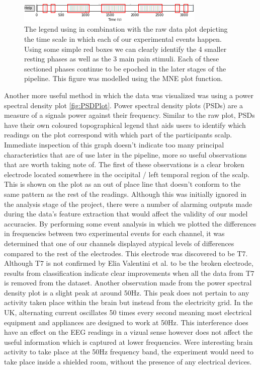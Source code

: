 \documentclass[11pt]{article}
\begin{document}
\begin{figure}[tb]
\centering
\includegraphics[width=0.8\textwidth]{Epoch.png}
\caption{\label{fig:Epoch}The legend using in combination with the raw data plot depicting the time scale in which each of our experimental events happen. Using some simple red boxes we can clearly identify the 4 smaller resting phases as well as the 3 main pain stimuli. Each of these sectioned phases continue to be epoched in the later stages of the pipeline. This figure was modelled using the MNE plot function.}
\end{figure} 

Another more useful method in which the data was visualized was using a power spectral density plot \ref{fig:PSDPlot}. Power spectral density plots (PSDs) are a measure of a signals power against their frequency. Similar to the raw plot, PSDs have their own coloured topographical legend that aids users to identify which readings on the plot correspond with which part of the participants scalp. Immediate inspection of this graph doesn't indicate too many principal characteristics that are of use later in the pipeline, more so useful observations that are worth taking note of. The first of these observations is a clear broken electrode located somewhere in the occipital / left temporal region of the scalp. This is shown on the plot as an out of place line that doesn't conform to the same pattern as the rest of the readings. Although this was initially ignored in the analysis stage of the project, there were a number of alarming outputs made during the data's feature extraction that would affect the validity of our model accuracies. By performing some event analysis in which we plotted the differences in frequencies between two experimental events for each channel, it was determined that one of our channels displayed atypical levels of differences compared to the rest of the electrodes. This electrode was discovered to be T7. Although T7 is not confirmed by Elia Valentini et al. to be the broken electrode, results from classification indicate clear improvements when all the data from T7 is removed from the dataset. Another observation made from the power spectral density plot is a slight peak at around 50Hz. This peak does not pertain to any activity taken place within the brain but instead from the electricity grid. In the UK, alternating current oscillates 50 times every second meaning most electrical equipment and appliances are designed to work at 50Hz. This interference does have an effect on the EEG readings in a vizual sense however does not affect the useful information which is captured at lower frequencies. Were interesting brain activity to take place at the 50Hz frequency band, the experiment would need to take place inside a shielded room, without the presence of any electrical devices.
\end{document}
